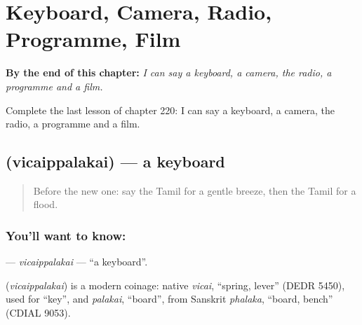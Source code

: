 
\chapter{Keyboard, Camera, Radio, Programme, Film}
\label{ch:ta-keyboard-camera-radio-programme-film}

\begin{chapteropening}
\textbf{By the end of this chapter:} \emph{I can say a keyboard, a camera, the radio, a programme and a film.}

Complete the last lesson of chapter 220: I can say a keyboard, a camera, the radio, a programme and a film.
\end{chapteropening}

\section[\texorpdfstring{\ta{விசைப்பலகை} (vicaippalakai)}{விசைப்பலகை (vicaippalakai)}]{ (vicaippalakai) — a keyboard}

\label{lesson:TA-C220-vicaippalakai}



\begin{quote}
Before the new one: say the Tamil for a gentle breeze, then the Tamil for a flood.
\end{quote}

\subsection*{You'll want to know: }
\textbf{} — \emph{vicaippalakai} — \textquotedblleft{}a keyboard\textquotedblright{}.

\begin{cousinweb}
\textbf{} (\emph{vicaippalakai}) is a modern coinage: native \emph{vicai}, \textquotedblleft{}spring, lever\textquotedblright{} (DEDR 5450), used for \textquotedblleft{}key\textquotedblright{}, and \emph{palakai}, \textquotedblleft{}board\textquotedblright{}, from Sanskrit \emph{phalaka}, \textquotedblleft{}board, bench\textquotedblright{} (CDIAL 9053).
\end{cousinweb}

